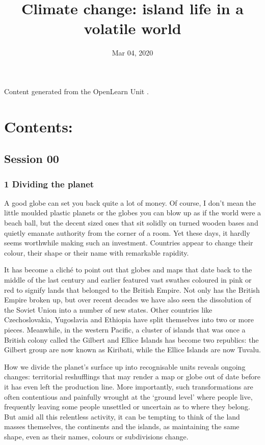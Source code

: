 \documentclass[letterpaper,10pt,english]{sphinxmanual}
\title{Climate change: island life in a volatile world}
\date{Mar 04, 2020}
\author{}
\begin{document}
\pagestyle{empty}
\sphinxmaketitle
\pagestyle{plain}
\sphinxtableofcontents
\pagestyle{normal}
\label{\detokenize{index::doc}}


Content generated from the OpenLearn Unit .


\chapter{Contents:}
\label{\detokenize{index:contents}}

\section{Session 00}
\label{\detokenize{index:session-00}}

\subsection{1 Dividing the planet}
\label{\detokenize{content/session_00/Part_00_01:1-Dividing-the-planet}}\label{\detokenize{content/session_00/Part_00_01::doc}}
A good globe can set you back quite a lot of money. Of course, I don’t mean the little moulded plastic planets or the globes you can blow up as if the world were a beach ball, but the decent sized ones that sit solidly on turned wooden bases and quietly emanate authority from the corner of a room. Yet these days, it hardly seems worthwhile making such an investment. Countries appear to change their colour, their shape or their name with remarkable rapidity.

It has become a cliché to point out that globes and maps that date back to the middle of the last century and earlier featured vast swathes coloured in pink or red to signify lands that belonged to the British Empire. Not only has the British Empire broken up, but over recent decades we have also seen the dissolution of the Soviet Union into a number of new states. Other countries like Czechoslovakia, Yugoslavia and Ethiopia have split themselves into two or more pieces. Meanwhile, in the
western Pacific, a cluster of islands that was once a British colony called the Gilbert and Ellice Islands has become two republics: the Gilbert group are now known as Kiribati, while the Ellice Islands are now Tuvalu.

How we divide the planet’s surface up into recognisable units reveals ongoing changes: territorial reshufflings that may render a map or globe out of date before it has even left the production line. More importantly, such transformations are often contentious and painfully wrought at the ‘ground level’ where people live, frequently leaving some people unsettled or uncertain as to where they belong. But amid all this relentless activity, it can be tempting to think of the land masses themselves,
the continents and the islands, as maintaining the same shape, even as their names, colours or subdivisions change.
\end{document}
